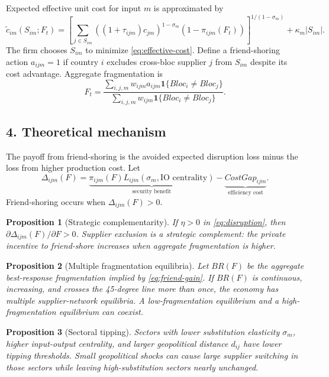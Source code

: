 \documentclass[11pt]{article}
\newtheorem{proposition}{Proposition}
\newcommand{\one}{\mathbf{1}}
\begin{document}
Expected effective unit cost for input $m$ is approximated by
\begin{equation}
\tilde c_{im}(S_{im};F_t)=\left[\sum_{j\in S_{im}} \left((1+\tau_{ijm})c_{jm}\right)^{1-\sigma_m}(1-\pi_{ijm}(F_t))\right]^{1/(1-\sigma_m)}+\kappa_m |S_{im}|. \label{eq:effective-cost}
\end{equation}
The firm chooses $S_{im}$ to minimize \eqref{eq:effective-cost}. Define a friend-shoring action $a_{ijm}=1$ if country $i$ excludes cross-bloc supplier $j$ from $S_{im}$ despite its cost advantage. Aggregate fragmentation is
\begin{equation}
F_t=\frac{\sum_{i,j,m} w_{ijm} a_{ijm}\one\{Bloc_i\neq Bloc_j\}}{\sum_{i,j,m}w_{ijm}\one\{Bloc_i\neq Bloc_j\}}. \label{eq:F}
\end{equation}

\subsection*{4. Theoretical mechanism}
The payoff from friend-shoring is the avoided expected disruption loss minus the loss from higher production cost. Let
\begin{equation}
\Delta_{ijm}(F)=\underbrace{\pi_{ijm}(F)L_{ijm}(\sigma_m,\text{IO centrality})}_{\text{security benefit}}-\underbrace{CostGap_{ijm}}_{\text{efficiency cost}}. \label{eq:friend-gain}
\end{equation}
Friend-shoring occurs when $\Delta_{ijm}(F)>0$.

\begin{proposition}[Strategic complementarity]
If $\eta>0$ in \eqref{eq:disruption}, then $\partial \Delta_{ijm}(F)/\partial F>0$. Supplier exclusion is a strategic complement: the private incentive to friend-shore increases when aggregate fragmentation is higher.
\end{proposition}

\begin{proposition}[Multiple fragmentation equilibria]
Let $BR(F)$ be the aggregate best-response fragmentation implied by \eqref{eq:friend-gain}. If $BR(F)$ is continuous, increasing, and crosses the 45-degree line more than once, the economy has multiple supplier-network equilibria. A low-fragmentation equilibrium and a high-fragmentation equilibrium can coexist.
\end{proposition}

\begin{proposition}[Sectoral tipping]
Sectors with lower substitution elasticity $\sigma_m$, higher input-output centrality, and larger geopolitical distance $d_{ij}$ have lower tipping thresholds. Small geopolitical shocks can cause large supplier switching in those sectors while leaving high-substitution sectors nearly unchanged.
\end{proposition}
\end{document}
